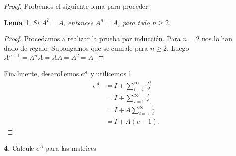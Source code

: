 \documentclass{article}
\newenvironment{statement}[1]{\smallskip\noindent\color[rgb]{1.00,0.00,0.50} {\bf #1.}}{}
\newtheorem{lemma}[theorem]{Lema}
\theoremstyle{definition}
\theoremstyle{remark}
\begin{document}
\begin{proof}
  Probemos el siguiente lema para proceder:
  \begin{lemma}\label{lem01}
    Si $A^2 = A$, entonces $A^n = A$, para todo $n \geq 2$.
  \end{lemma}
  \begin{proof}
    Procedamos a realizar la prueba por inducci\'on.
    Para $n = 2$ nos lo han dado de regalo.
    Supongamos que se cumple para $n \geq 2$.
    Luego $A^{n + 1} = A^n A = A A = A^2 = A$.
  \end{proof}
  Finalmente, desarollemos $e^A$ y utilicemos \cref{lem01}
  \begin{align*}
    e^A &= I + \sum_{i = 1}^{\infty} \frac{A^i}{i!}\\
    &= I + \sum_{i = 1}^{\infty} \frac{A}{i!}\\
    &= I + A \sum_{i = 1}^{\infty} \frac{1}{i!}\\
    &= I + A (e - 1).
  \end{align*}
\end{proof}

\begin{statement}{4}
  Calcule $e^A$ para las matrices
\end{statement}
\end{document}

